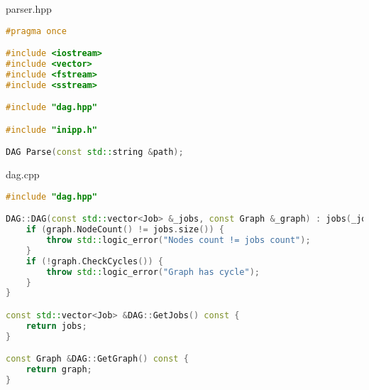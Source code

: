 \documentclass[a4paper, 12pt]{article}
\begin{document}
parser.hpp
\begin{lstlisting}[language=C++]
#pragma once

#include <iostream>
#include <vector>
#include <fstream>
#include <sstream>

#include "dag.hpp"

#include "inipp.h"

DAG Parse(const std::string &path);
\end{lstlisting}

dag.cpp
\begin{lstlisting}[language=C++]
#include "dag.hpp"

DAG::DAG(const std::vector<Job> &_jobs, const Graph &_graph) : jobs(_jobs), graph(_graph) {
    if (graph.NodeCount() != jobs.size()) {
        throw std::logic_error("Nodes count != jobs count");
    }
    if (!graph.CheckCycles()) {
        throw std::logic_error("Graph has cycle");
    }
}

const std::vector<Job> &DAG::GetJobs() const {
    return jobs;
}

const Graph &DAG::GetGraph() const {
    return graph;
}
\end{lstlisting}
\end{document}
